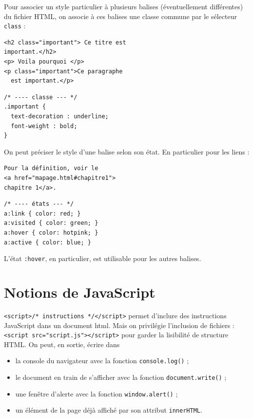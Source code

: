 Pour associer un style particulier à plusieurs balises (éventuellement différentes) du fichier HTML, on associe à ces balises une classe commune par le sélecteur \texttt{class} :

\begin{multicols}{2}
\begin{verbatim}
<h2 class="important"> Ce titre est 
important.</h2>
<p> Voila pourquoi </p>
<p class="important">Ce paragraphe 
  est important.</p>
\end{verbatim}
\begin{verbatim}
/* ---- classe --- */
.important {
  text-decoration : underline;
  font-weight : bold;
}
\end{verbatim}

\end{multicols}

On peut préciser le style d'une balise selon son état. En particulier pour les liens :

\begin{multicols}{2}
\begin{verbatim}
Pour la définition, voir le
<a href="mapage.html#chapitre1">
chapitre 1</a>.
\end{verbatim}

\begin{verbatim}
/* ---- états --- */
a:link { color: red; }
a:visited { color: green; }
a:hover { color: hotpink; }
a:active { color: blue; }
\end{verbatim}

\end{multicols}

L'état \texttt{:hover}, en particulier, est utilisable pour les autres balises. 

\section{Notions de JavaScript}


\texttt{<script>/* instructions */</script>} permet d'inclure des instructions JavaScript dans un document html. Mais on privilégie l'inclusion de fichiers : \texttt{<script src="script.js"></script>} pour garder la lisibilité de structure HTML. On peut, en sortie,  écrire dans 
\begin{itemize}
	\item la console du navigateur avec la fonction \texttt{console.log()} ;
	\item le document en train de s'afficher avec la fonction \texttt{document.write()} ;
	\item une fenêtre d'alerte avec la fonction \texttt{window.alert()} ;
	\item un élément de la page déjà affiché par son attribut \texttt{innerHTML}.
\end{itemize} 

